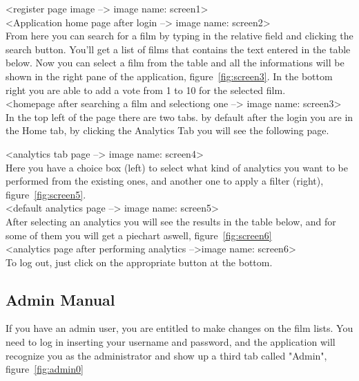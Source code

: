 \documentclass[a4paper, oneside]{article}
\begin{document}
<register page image --> image name: screen1>\\

<Application home page after login --> image name: screen2> \\

From here you can search for a film by typing in the relative field and clicking the search button. You'll get a list of films that contains the text entered in the table below. Now you can select a film from the table and all the informations will be shown in the right pane of the application, figure~\ref{fig:screen3}. In the bottom right you are able to add a vote from 1 to 10 for the selected film.\\

<homepage after searching a film and selectiong one --> image name: screen3>\\

In the top left of the page there are two tabs. by default after the login you are in the Home tab, by clicking the Analytics Tab you will see the following page.

<analytics tab page --> image name: screen4>\\

Here you have a choice box (left) to select what kind of analytics you want to be performed from the existing ones, and another one to apply a filter (right), figure~\ref{fig:screen5}. \\

<default analytics page --> image name: screen5>\\

After selecting an analytics you will see the results in the table below, and for some of them you will get a piechart aswell, figure~\ref{fig:screen6}\\

<analytics page after performing analytics -->image name: screen6>\\

To log out, just click on the appropriate button at the bottom.

\clearpage
\subsection{Admin Manual}
If you have an admin user, you are entitled to make changes on the film lists. You need to log in inserting your username and password, and the application will recognize you as the administrator and show up a third tab called "Admin", figure~\ref{fig:admin0}\\
\end{document}
